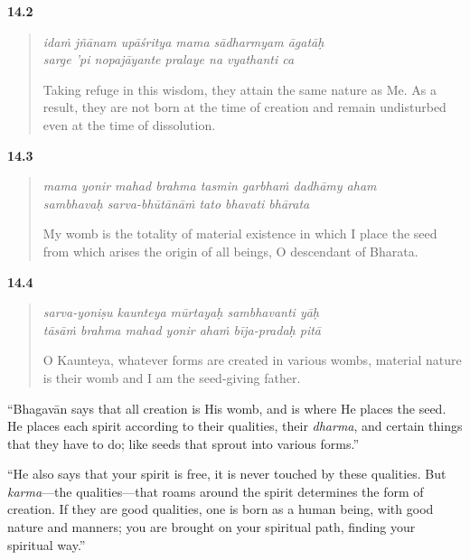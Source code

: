 \par\noindent\textbf{14.2}\par
\begin{verse}
\textit{idaṁ jñānam upāśritya mama sādharmyam āgatāḥ} \\
\textit{sarge ’pi nopajāyante pralaye na vyathanti ca}

\noindent Taking refuge in this wisdom, they attain the same nature as Me. As a result, they are not born at the time of creation and remain undisturbed even at the time of dissolution.
\end{verse}
\par



\par\noindent\textbf{14.3}\par
\begin{verse}
\textit{mama yonir mahad brahma tasmin garbhaṁ dadhāmy aham} \\
\textit{sambhavaḥ sarva-bhūtānāṁ tato bhavati bhārata}

\noindent My womb is the totality of material existence in which I place the seed from which arises the origin of all beings, O descendant of Bharata.
\end{verse}
\par



\par\noindent\textbf{14.4}\par
\begin{verse}
\textit{sarva-yoniṣu kaunteya mūrtayaḥ sambhavanti yāḥ} \\
\textit{tāsāṁ brahma mahad yonir ahaṁ bīja-pradaḥ pitā}

\noindent O Kaunteya, whatever forms are created in various wombs, material nature is their womb and I am the seed-giving father.
\end{verse}
\par


\enquote{Bhagavān says that all creation is His womb, and is where He places the seed. He places each spirit according to their qualities, their \textit{dharma}, and certain things that they have to do; like seeds that sprout into various forms.}

\enquote{He also says that your spirit is free, it is never touched by these qualities. But \textit{karma}---the qualities---that roams around the spirit determines the form of creation. If they are good qualities, one is born as a human being, with good nature and manners; you are brought on your spiritual path, finding your spiritual way.}

